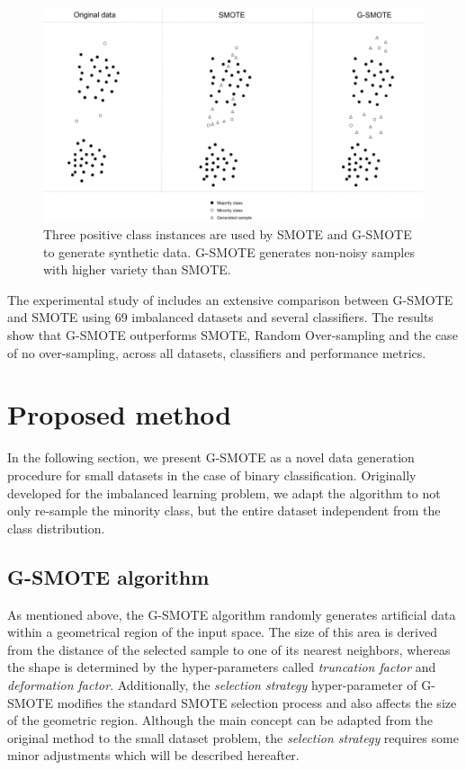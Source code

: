 \documentclass[parskip=full]{scrartcl}
\begin{document}
\begin{figure}[H]
	\centering
	\includegraphics[width=1\linewidth]{../analysis/smote_vs_gsmote}
	\caption{Three positive class instances are used by SMOTE and G-SMOTE 
	to generate synthetic data. G-SMOTE generates non-noisy samples 
	with higher variety than SMOTE.}
	\label{fig:smotevsgsmote}
\end{figure}

The experimental study of \cite{Douzas.2019} includes an extensive comparison
between G-SMOTE and SMOTE using 69 imbalanced datasets and several classifiers.
The results show that G-SMOTE outperforms SMOTE, Random Over-sampling and the
case of no over-sampling, across all datasets, classifiers and performance
metrics.

\section{Proposed method}

In the following section, we present G-SMOTE as a novel data generation
procedure for small datasets in the case of binary classification. Originally
developed for the imbalanced learning problem, we adapt the algorithm to not
only re-sample the minority class, but the entire dataset independent from the
class distribution. 

\subsection{G-SMOTE algorithm}

As mentioned above, the G-SMOTE algorithm randomly generates artificial data
within a geometrical region of the input space. The size of this area is derived
from the distance of the selected sample to one of its nearest neighbors,
whereas the shape is determined by the hyper-parameters called
\textit{truncation factor} and \textit{deformation factor}. Additionally, the
\textit{selection strategy} hyper-parameter  of G-SMOTE modifies the standard
SMOTE selection process and also affects the size of the geometric region.
Although the main concept can be adapted from the original method to the small
dataset problem, the \textit{selection strategy} requires some minor adjustments
which will be described hereafter.
\end{document}
